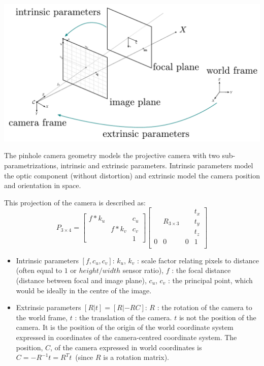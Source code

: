 \documentclass[11pt, letterpaper]{report}
\begin{document}
\begin{center}
\includegraphics[scale=.6]{figures/pinhole_geometry}
\end{center}


The pinhole camera geometry models the projective camera with two sub-parametrizations, intrinsic and extrinsic parameters. Intrinsic parameters model the optic component (without distortion) and extrinsic model the camera position and orientation in space.

This projection of the camera is described as:
\begin{equation}
P_{3 \times 4} =
\begin{bmatrix}
f*k_u &  & c_u \\
 & f*k_v & c_v \\
 &  & 1
\end{bmatrix}
\begin{bmatrix}
 &  &  & t_x \\
 & R_{3 \times 3} &  & t_y \\
  &  &  & t_z \\
  0 & 0 & 0 & 1\\
\end{bmatrix}
\end{equation}

\begin{itemize}
\item Intrinsic parameters $[f, c_u, c_v]$:
\subitem $k_u$, $k_v$ : scale factor relating pixels to distance (often equal to $1$ or $height/width$  sensor ratio),
\subitem $f$ : the focal distance (distance between focal and image plane),
\subitem $c_u$, $c_v$ : the principal point, which would be ideally in the centre of the image.
\item Extrinsic parameters $[R|t] = [R|-R C]$:
\subitem $R$ : the rotation of the camera to the world frame,
\subitem $t$ : the translation of the camera. $t$ is not the position of the camera. It is the position of the origin of the world coordinate system expressed in coordinates of the camera-centred coordinate system. The position, $C$, of the camera expressed in world coordinates is~$C=-R^{-1} t = R^T t$~(since $R$ is a rotation matrix).
\end{itemize}
\end{document}
